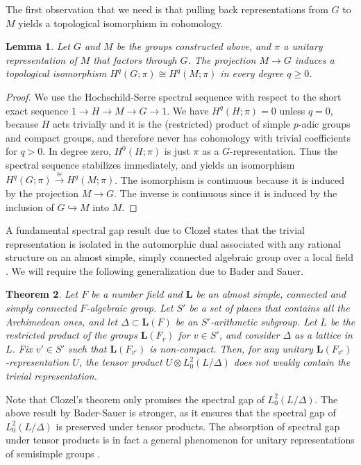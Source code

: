 \documentclass[12pt,reqno]{amsart}
\newtheorem{theorem}{Theorem}[section]
\newtheorem{lemma}[theorem]{Lemma}
\theoremstyle{definition}
\begin{document}
The first observation that we need is that pulling back representations from $G$ to $M$ yields a topological isomorphism in cohomology.
\begin{lemma}\label{lem:topological HS}
    Let $G$ and $M$ be the groups constructed above, and $\pi$ a unitary representation of $M$ that factors through $G$. The projection $M \to G$ induces a topological isomorphism $H^q(G;\pi) \cong H^q(M;\pi)$ in every degree $q \geq 0$.
\end{lemma}
\begin{proof}
We use the Hochschild-Serre spectral sequence \cite[Theorem 9.1]{Blanc} with respect to the short exact sequence $1 \rightarrow H \rightarrow M \rightarrow G \rightarrow 1$. We have $H^q(H;\pi)=0$ unless $q=0$, because $H$ acts trivially and it is the (restricted) product of simple $p$-adic groups and compact groups, and therefore never has cohomology with trivial coefficients for $q > 0$. In degree zero, $H^0(H;\pi)$ is just $\pi$ as a $G$-representation. Thus the spectral sequence stabilizes immediately, and yields an isomorphism $H^q(G;\pi)\xrightarrow{\cong} H^q(M;\pi)$. The isomorphism is continuous because it is induced by the projection $M \to G$. The inverse is continuous since it is induced by the inclusion of $G \hookrightarrow M$ into $M$. 
\end{proof}
A fundamental spectral gap result due to Clozel states that the trivial representation is isolated in the automorphic dual associated with any rational structure on an almost simple, simply connected algebraic group over a local field \cite[Theorem~3.1]{Clozel}. We will require the following generalization due to Bader and Sauer.
\begin{theorem}\cite[Theorem~4.13]{BaderSauer}\label{clozel}
    Let $F$ be a number field and $\mathbf{L}$ be an almost simple, connected and simply connected $F$-algebraic group. Let $S'$ be a set of places that contains all the Archimedean ones, and let $\Delta \subset \mathbf{L}(F)$ be an $S'$-arithmetic subgroup. Let $L$ be the restricted product of the groups $\mathbf{L}(F_v)$ for $v \in S'$, and consider $\Delta$ as a lattice in $L$. Fix $v' \in S'$ such that $\mathbf{L}(F_{v'})$ is non-compact. Then, for any unitary $\mathbf{L}(F_{v'})$-representation $U$, the tensor product $U \otimes L^2_0(L/\Delta)$ does not weakly contain the trivial representation.
\end{theorem}
Note that Clozel's theorem only promises the spectral gap of $L^2_0(L/\Delta)$. The above result by Bader-Sauer is stronger, as it ensures that the spectral gap of $L^2_0(L/\Delta)$ is preserved under tensor products. The absorption of spectral gap under tensor products is in fact a general phenomenon for unitary representations of semisimple groups \cite{Gorfine}.
\end{document}
